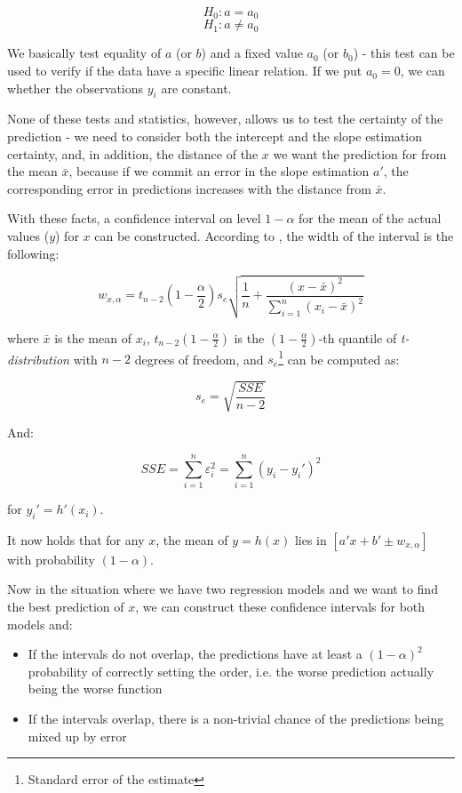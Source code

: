 \[H_0: a = a_0\]
\[H_1: a \neq a_0 \]

We basically test equality of $a$ (or $b$) and a fixed value $a_0$ (or $b_0$) - this test can be used to verify if the data have a specific linear relation. If we put $a_0 = 0$, we can whether the observations $y_i$ are constant. 

None of these tests and statistics, however, allows us to test the certainty of the prediction - we need to consider both the intercept and the slope estimation certainty, and, in addition, the distance of the $x$ we want the prediction for from the mean $\bar{x}$, because if we commit an error in the slope estimation $a'$, the corresponding error in predictions increases with the distance from $\bar{x}$. 

With these facts, a confidence interval on level $1 - \alpha$ for the mean of the actual values ($y$) for $x$ can be constructed. According to \cite{weiss_introductory_2010}, the width of the interval is the following:


\[
w_{x, \alpha} = t_{n - 2}(1-\frac{\alpha}{2}) s_e\sqrt{\frac{1}{n} + \frac{(x - \bar{x})^2}{ \sum_{i = 1}^{n} (x_i - \bar{x})^2 }}
\]

where \(\bar{x}\) is the mean of \(x_i\), $t_{n - 2}(1-\frac{\alpha}{2})$ is the $(1-\frac{\alpha}{2})$-th quantile of \textit{t-distribution} with $n-2$ degrees of freedom, and $s_e$\footnote{Standard error of the estimate} can be computed as:

\[s_e = \sqrt{\frac{SSE}{n-2}}\]

And:

\[SSE = \sum_{i = 1}^{n} \varepsilon_i^2  =  \sum_{i = 1}^{n} (y_i - y_i')^2 \]

for \(y_i' = h'(x_i)\).

It now holds that for any $x$, the mean of $y = h(x)$ lies in $[a'x + b' \pm w_{x, \alpha}]$ with probability $(1-\alpha)$.

Now in the situation where we have two regression models and we want to find the best prediction of $x$, we can construct these confidence intervals for both models and:

\begin{itemize}
	\item If the intervals do not overlap, the predictions have at least a $(1 - \alpha)^2$ probability of correctly setting the order, i.e. the worse prediction actually being the worse function
	\item If the intervals overlap, there is a non-trivial chance of the predictions being mixed up by error
\end{itemize}

